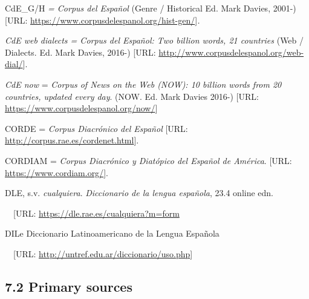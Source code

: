\begin{styleStandard}
CdE\_G/H\textit{ = Corpus del Español} (Genre / Historical Ed. Mark Davies, 2001-) [URL: \url{https://www.corpusdelespanol.org/hist-gen/}]\textit{.}
\end{styleStandard}

\begin{styleStandard}
\textit{CdE web dialects = Corpus del Español: Two billion words, 21 countries }(Web / Dialects. Ed. Mark Davies, 2016-) [URL: \url{http://www.corpusdelespanol.org/web-dial/}].
\end{styleStandard}

\begin{styleStandard}
\textit{CdE now }=\textbf{ }\textit{Corpus of News on the Web (NOW): 10 billion words from 20 countries, updated every day}. (NOW. Ed. Mark Davies 2016-) [URL: \url{https://www.corpusdelespanol.org/now/}]
\end{styleStandard}

\begin{styleStandard}
CORDE = \textit{Corpus Diacrónico del Español} [URL: \url{http://corpus.rae.es/cordenet.html}]. 
\end{styleStandard}

\begin{styleStandard}
CORDIAM = \textit{Corpus Diacrónico y Diatópico del Español de América}. [URL: \url{https://www.cordiam.org/}].
\end{styleStandard}

\begin{styleStandard}
DLE, s.v. \textit{cualquiera}. \textit{Diccionario de la lengua española}, 23.4 online edn. 
\end{styleStandard}

\begin{styleStandard}
\ \ [URL: \url{https://dle.rae.es/cualquiera?m=form}\textstyleInternetlink{]}
\end{styleStandard}

\begin{styleStandard}
DILe Diccionario Latinoamericano de la Lengua Española 
\end{styleStandard}

\begin{styleStandard}
\ \ [URL: \url{http://untref.edu.ar/diccionario/uso.php}]
\end{styleStandard}

\subsection[7.2 Primary sources]{7.2 Primary sources}
